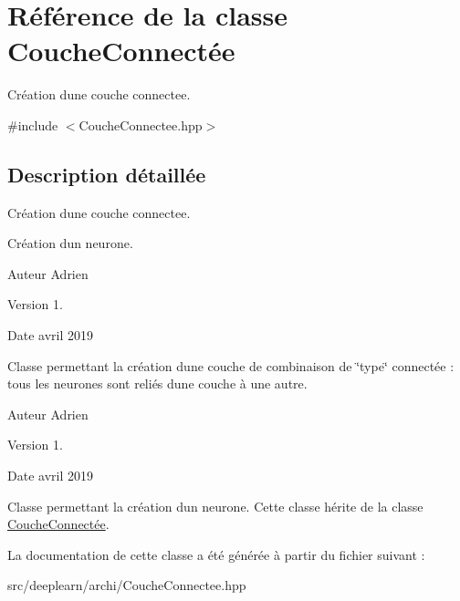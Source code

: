 \hypertarget{classCoucheConnect_xC3_xA9e}{}\section{Référence de la classe Couche\+Connectée}
\label{classCoucheConnect_xC3_xA9e}


Création d\textquotesingle{}une couche connectee.  




{\ttfamily \#include $<$Couche\+Connectee.\+hpp$>$}



\subsection{Description détaillée}
Création d\textquotesingle{}une couche connectee. 

Création d\textquotesingle{}un neurone.

\begin{DoxyAuthor}{Auteur}
Adrien 
\end{DoxyAuthor}
\begin{DoxyVersion}{Version}
1. 
\end{DoxyVersion}
\begin{DoxyDate}{Date}
avril 2019
\end{DoxyDate}
Classe permettant la création d\textquotesingle{}une couche de combinaison de \char`\"{}type\char`\"{} connectée \+: tous les neurones sont reliés d\textquotesingle{}une couche à une autre.

\begin{DoxyAuthor}{Auteur}
Adrien 
\end{DoxyAuthor}
\begin{DoxyVersion}{Version}
1. 
\end{DoxyVersion}
\begin{DoxyDate}{Date}
avril 2019
\end{DoxyDate}
Classe permettant la création d\textquotesingle{}un neurone. Cette classe hérite de la classe \hyperlink{classCoucheConnect_xC3_xA9e}{Couche\+Connectée}. 

La documentation de cette classe a été générée à partir du fichier suivant \+:\begin{DoxyCompactItemize}
\item 
src/deeplearn/archi/Couche\+Connectee.\+hpp\end{DoxyCompactItemize}
